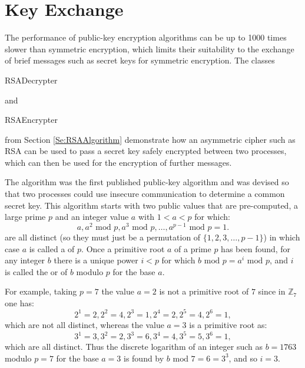 
\section{Key Exchange}


The performance of public-key encryption algorithms
can be up to 1000 times slower than symmetric encryption,
which limits their suitability to the exchange of
brief messages such as secret keys for symmetric encryption.
The classes \begin{code}RSADecrypter\end{code} and
\begin{code}RSAEncrypter\end{code} from Section \ref{Se:RSAAlgorithm}
demonstrate how an asymmetric cipher such as RSA can be used to pass a
secret key safely encrypted between two processes, which can then be
used for the encryption of further messages.

The  algorithm was the first published
public-key algorithm and was devised so that two processes could
use insecure communication to determine a common secret key.
This algorithm starts with two public values that are pre-computed,
a large prime $p$ and an integer value $a$ with $1<a<p$ for which:
\begin{displaymath}
  a, a^2\mbox{ mod }p, a^3\mbox{ mod }p, \dots, a^{p-1}\mbox{ mod }p=1.
\end{displaymath}
are all distinct (so they must just be a permutation of $\{1,2,3,\dots, p-1\}$)
in which case $a$ is called a  of $p$.
Once a primitive root $a$ of a prime $p$ has been found,
for any integer $b$ there is a unique power $i<p$
for which $b\mbox{ mod }p=a^i\mbox{ mod }p$, and $i$ is
called the  or  of $b$ modulo $p$ for
the base $a$.

For example, taking $p=7$ the value $a=2$ is not a primitive root of $7$ since in
$\mathbb{Z}_7$ one has:
\begin{displaymath}
  2^1=2, 2^2=4, 2^3=1, 2^4=2, 2^5=4, 2^6=1,
\end{displaymath}
which are not all distinct, whereas the value $a=3$ is a primitive root as:
\begin{displaymath}
  3^1=3, 3^2=2, 3^3=6, 3^4=4, 3^5=5, 3^6=1,
\end{displaymath}
which are all distinct.
Thus the discrete logarithm of an integer such as $b=1763$ modulo $p=7$ for the
base $a=3$ is found by $b\mbox{ mod }7=6=3^3$, and so $i=3$.

